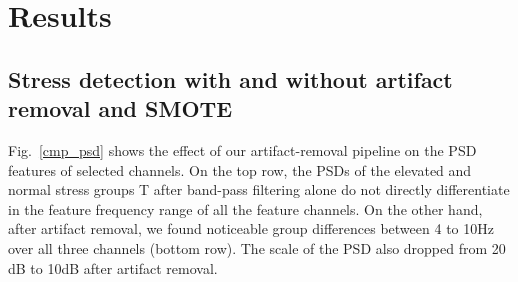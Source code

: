 \documentclass[journal]{IEEEtran}
\begin{document}
\section{Results}
\subsection{Stress detection with and without artifact removal and SMOTE}


Fig.~\ref{cmp_psd} shows the effect of our artifact-removal pipeline on the PSD features of selected channels.
On the top row, the PSDs of the elevated and normal stress groups  T after band-pass filtering alone do not directly differentiate in the feature frequency range of all the feature channels.
On the other hand, after artifact removal, we found noticeable group differences between 4 to 10Hz over all three channels (bottom row). The scale of the PSD also dropped from 20 dB to 10dB after artifact removal.
\end{document}
